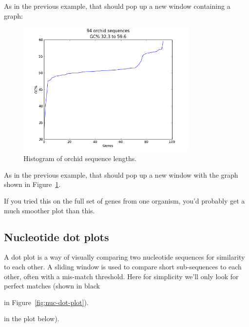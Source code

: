 \documentclass{report}
\begin{document}
%
%
\begin{htmlonly}
\noindent As in the previous example, that should pop up a new window containing a graph:


\end{htmlonly}
%
%
\begin{latexonly}
\begin{figure}[htbp]
\centering
\includegraphics[width=0.8\textwidth]{images/gc_plot.png}
\caption{Histogram of orchid sequence lengths.}
\label{fig:seq-gc-plot}
\end{figure}
\noindent As in the previous example, that should pop up a new window with the graph shown in Figure~\ref{fig:seq-gc-plot}.
\end{latexonly}
%
%
If you tried this on the full set of genes from one organism, you'd probably get a much
smoother plot than this.

\subsection{Nucleotide dot plots}
A dot plot is a way of visually comparing two nucleotide sequences for similarity to
each other.  A sliding window is used to compare short sub-sequences to each other,
often with a mis-match threshold.  Here for simplicity we'll only look for perfect
matches (shown in black
\begin{latexonly}
in Figure~\ref{fig:nuc-dot-plot}).
\end{latexonly}
\begin{htmlonly}
in the plot below).
\end{htmlonly}
\end{document}
